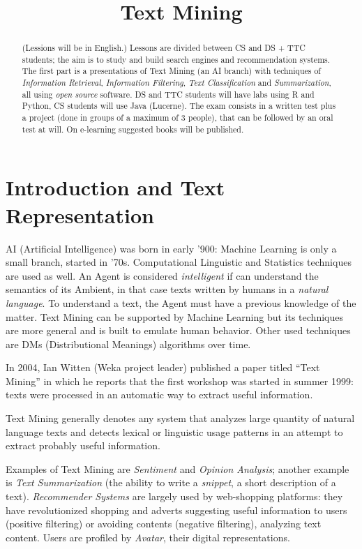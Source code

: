 \documentclass[11pt, a4page]{article}
\title{\textbf{Text Mining}}
\author{}
\date{}
\begin{document}
\maketitle
\begin{abstract}
  (Lessions will be in English.)
  Lessons are divided between CS and DS + TTC students; the aim is to study and build search engines and recommendation systems.
  The first part is a presentations of Text Mining (an AI branch) with techniques of \textit{Information Retrieval}, \textit{Information Filtering}, \textit{Text Classification} and \textit{Summarization}, all using \textit{open source} software.
  DS and TTC students will have labs using R and Python, CS students will use Java (Lucerne).
  The exam consists in a written test plus a project (done in groups of a maximum of 3 people), that can be followed by an oral test at will.
  On e-learning suggested books will be published.
\end{abstract}
\tableofcontents
\newpage

\part{Introduction and Text Representation}
AI (Artificial Intelligence) was born in early '900: Machine Learning is only a small branch, started in '70s.
Computational Linguistic and Statistics techniques are used as well.
An Agent is considered \textit{intelligent} if can understand the semantics of its Ambient, in that case texts written by humans in a \textit{natural language}.
To understand a text, the Agent must have a previous knowledge of the matter.
Text Mining can be supported by Machine Learning but its techniques are more general and is built to emulate human behavior.
Other used techniques are DMs (Distributional Meanings) algorithms over time.

In 2004, Ian Witten (Weka project leader) published a paper titled ``Text Mining'' in which he reports that the first workshop was started in summer 1999: texts were processed in an automatic way to extract useful information.

Text Mining generally denotes any system that analyzes large quantity of natural language texts and detects lexical or linguistic usage patterns in an attempt to extract probably useful information.

Examples of Text Mining are \textit{Sentiment} and \textit{Opinion Analysis}; another example is \textit{Text Summarization} (the ability to write a \textit{snippet}, a short description of a text).
\textit{Recommender Systems} are largely used by web-shopping platforms: they have revolutionized shopping and adverts suggesting useful information to users (positive filtering) or avoiding contents (negative filtering), analyzing text content.
Users are profiled by \textit{Avatar}, their digital representations.
\end{document}
